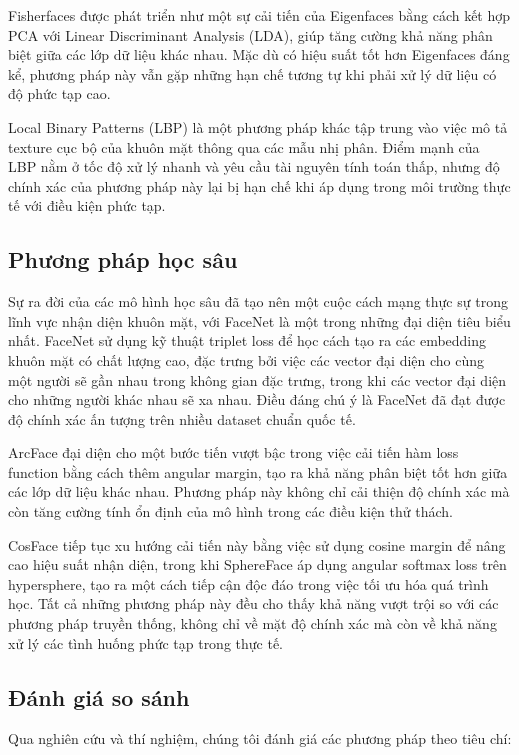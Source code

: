 \documentclass[12pt,a4paper]{report}
\begin{document}
Fisherfaces được phát triển như một sự cải tiến của Eigenfaces bằng cách kết hợp PCA với Linear Discriminant Analysis (LDA), giúp tăng cường khả năng phân biệt giữa các lớp dữ liệu khác nhau. Mặc dù có hiệu suất tốt hơn Eigenfaces đáng kể, phương pháp này vẫn gặp những hạn chế tương tự khi phải xử lý dữ liệu có độ phức tạp cao.

Local Binary Patterns (LBP) là một phương pháp khác tập trung vào việc mô tả texture cục bộ của khuôn mặt thông qua các mẫu nhị phân. Điểm mạnh của LBP nằm ở tốc độ xử lý nhanh và yêu cầu tài nguyên tính toán thấp, nhưng độ chính xác của phương pháp này lại bị hạn chế khi áp dụng trong môi trường thực tế với điều kiện phức tạp.

\subsection{Phương pháp học sâu}
Sự ra đời của các mô hình học sâu đã tạo nên một cuộc cách mạng thực sự trong lĩnh vực nhận diện khuôn mặt, với FaceNet là một trong những đại diện tiêu biểu nhất. FaceNet sử dụng kỹ thuật triplet loss để học cách tạo ra các embedding khuôn mặt có chất lượng cao, đặc trưng bởi việc các vector đại diện cho cùng một người sẽ gần nhau trong không gian đặc trưng, trong khi các vector đại diện cho những người khác nhau sẽ xa nhau. Điều đáng chú ý là FaceNet đã đạt được độ chính xác ấn tượng trên nhiều dataset chuẩn quốc tế.

ArcFace đại diện cho một bước tiến vượt bậc trong việc cải tiến hàm loss function bằng cách thêm angular margin, tạo ra khả năng phân biệt tốt hơn giữa các lớp dữ liệu khác nhau. Phương pháp này không chỉ cải thiện độ chính xác mà còn tăng cường tính ổn định của mô hình trong các điều kiện thử thách.

CosFace tiếp tục xu hướng cải tiến này bằng việc sử dụng cosine margin để nâng cao hiệu suất nhận diện, trong khi SphereFace áp dụng angular softmax loss trên hypersphere, tạo ra một cách tiếp cận độc đáo trong việc tối ưu hóa quá trình học. Tất cả những phương pháp này đều cho thấy khả năng vượt trội so với các phương pháp truyền thống, không chỉ về mặt độ chính xác mà còn về khả năng xử lý các tình huống phức tạp trong thực tế.

\subsection{Đánh giá so sánh}
Qua nghiên cứu và thí nghiệm, chúng tôi đánh giá các phương pháp theo tiêu chí:
\end{document}
